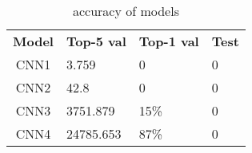 

\begin{table}[htbp]
\begin{center}
\begin{tabular}{|c|l|l|l|}
\cline{1-4}
\textbf{Model} & \textbf{Top-5 val} & \textbf{Top-1 val} & \textbf{Test}  \\
\cline{1-4}
          CNN1 &   3.759  		&  0 	& 0\\
          CNN2 &   42.8  		&  0 	& 0\\
          CNN3 &   3751.879  	&  15\% & 0\\
          CNN4 &   24785.653  	& 87\% 	&	0\\

\cline{1-4}
\end{tabular}
\caption[]
{\small
accuracy of models
}
\label{table:accuracy}
\end{center}
\end{table}
